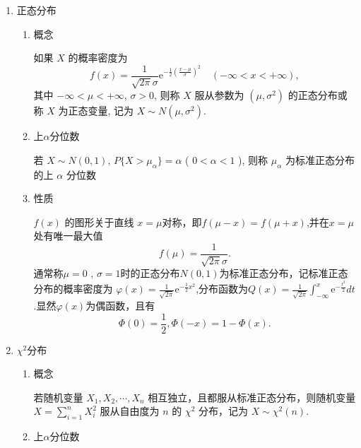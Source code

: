 \begin{enumerate}
      \item 正态分布
            \begin{enumerate}
                  \item 概念

                        如果 $X$ 的概率密度为
                        $$f(x) = \frac{1}{\sqrt{2 \pi} \sigma} \mathrm{e}^{-\frac{1}{2} \left( \frac{x - \mu}{\sigma} \right)^2} \quad (-\infty < x < +\infty),$$
                        其中 $-\infty < \mu < +\infty$, $\sigma > 0$, 则称 $X$ 服从参数为 $(\mu, \sigma^2)$ 的正态分布或称 $X$ 为正态变量, 记为 $X \sim N(\mu, \sigma^2)$.
                  \item 上$\alpha$分位数

                        若 $X \sim N(0, 1)$, $P\{X > \mu_\alpha\} = \alpha$ ( $0 < \alpha < 1$ ), 则称 $\mu_\alpha$ 为标准正态分布的上 $\alpha$ 分位数
                  \item 性质

                        $f(x)$ 的图形关于直线 $x=\mu$对称，即$f(\mu-x)=f(\mu+x)$,并在$x=\mu$处有唯一最大值
                        $$f(\mu)=\frac{1}{\sqrt{2\pi}\sigma}.$$
                        通常称$\mu=0$ , $\sigma=1$时的正态分布$N(0,1)$为标准正态分布，记标准正态分布的概率密度为
                        $\varphi(x)=\frac{1}{\sqrt{2\pi}}\mathrm{e}^{-\frac{1}{2}x^{2}}$,分布函数为$Q(x)=\frac1{\sqrt{2\pi}}\int_{-\infty}^{x}\mathrm{e}^{-\frac{t^{2}}{2}}dt$ .显然$\varphi(x)$为偶函数，且有
                        $$\Phi(0)=\frac{1}{2},\Phi(-x)=1-\Phi(x).$$
            \end{enumerate}
      \item $\chi^2$分布
            \begin{enumerate}
                  \item 概念

                        若随机变量 $X_{1}, X_{2}, \cdots, X_{n}$ 相互独立，且都服从标准正态分布，则随机变量 $X = \sum_{i=1}^{n} X_{i}^{2}$ 服从自由度为 $n$ 的 $\chi^{2}$ 分布，记为 $X \sim \chi^{2}(n)$.
                  \item 上$\alpha$分位数


\end{enumerate}
\end{enumerate}
